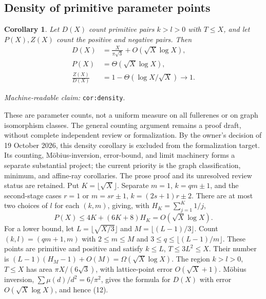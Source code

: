 \documentclass[11pt]{amsart}
\newcommand{\record}[1]{\nolinkurl{#1}}
\newtheorem{corollary}[theorem]{Corollary}
\newcommand{\claimid}[1]{\par\nopagebreak\noindent\textit{Machine-readable claim:} \record{#1}.\par}
\begin{document}
\subsection{Density of primitive parameter points}
\begin{samepage}\begin{corollary}\label{cor:density}
Let $D(X)$ count primitive pairs $k>l>0$ with $T\le X$, and let
$P(X),Z(X)$ count the positive and negative pairs. Then
\begin{equation}\label{eq:12}
\begin{aligned}
D(X)&=\frac{X}{\pi\sqrt3}+O(\sqrt X\log X),\\
P(X)&=\Theta(\sqrt X\log X),\\
\frac{Z(X)}{D(X)}&=1-\Theta(\log X/\sqrt X)\longrightarrow1.
\end{aligned}\tag{12}
\end{equation}
\end{corollary}
\claimid{cor:density}\end{samepage}
These are parameter counts, not a uniform measure on all fullerenes
or on graph isomorphism classes. The general counting argument remains
a proof draft, without complete independent review or formalization.
By the owner's decision of 19 October 2026, this density corollary is
excluded from the formalization target. Its counting, M\"obius-inversion,
error-bound, and limit machinery forms a separate substantial project;
the current priority is the graph classification, minimum, and affine-ray
corollaries. The prose proof and its unresolved review status are retained.
Put $K=\lfloor\sqrt X\rfloor$. Separate $m=1$, $k=qm\pm1$,
and the second-stage cases $r=1$ or $m=sr\pm1$,
$k=(2s+1)r\pm2$. There are at most two choices of $l$ for each
$(k,m)$, giving, with $H_K=\sum_{j=1}^K1/j$,
\[
 P(X)\le4K+(6K+8)H_K=O(\sqrt X\log X).
\]
For a lower bound, let $L=\lfloor\sqrt{X/3}\rfloor$ and
$M=\lfloor(L-1)/3\rfloor$. Count $(k,l)=(qm+1,m)$ with
$2\le m\le M$ and $3\le q\le\lfloor(L-1)/m\rfloor$.
These points are primitive and positive and satisfy $k\le L$,
$T\le3L^2\le X$. Their number is
$(L-1)(H_M-1)+O(M)=\Omega(\sqrt X\log X)$.
The region $k>l>0$, $T\le X$ has area $\pi X/(6\sqrt3)$,
with lattice-point error $O(\sqrt X+1)$. M\"obius inversion,
$\sum\mu(d)/d^2=6/\pi^2$, gives the formula for $D(X)$ with
error $O(\sqrt X\log X)$, and hence (12).
\end{document}
